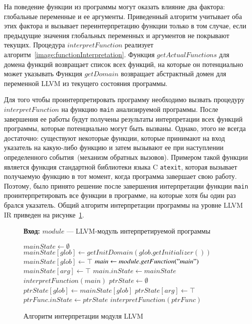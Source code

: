 На поведение функции из программы могут оказать влияние два фактора: 
глобальные переменные и ее аргументы. Приведенный алгоритм учитывает оба этих 
фактора и вызывает переинтерпретацию функции только в том случае, если 
предыдущие значения глобальных переменных и аргументов не покрывают текущих. 
Процедура $interpretFunction$ реализует 
алгоритм~\ref{image:functionInterpretation}. Функция $getActualFunctions$ для 
домена функций возвращает список всех функций, на которые он потенциально 
может указывать Функция $getDomain$ возвращает абстрактный домен для 
переменной LLVM из текущего состояния программы.

Для того чтобы проинтерпретировать программу необходимо вызвать процедуру 
$interpretFunction$ на функцию \texttt{main} анализируемой программы. После 
завершения ее работы будут получены результаты интерпретации всех функций
программы, которые потенциально могут быть вызваны. Однако, этого не всегда
достаточно: существуют некоторые функции, которые принимают на вход указатель
на какую-либо функцию и затем вызывают ее при наступлении определенного 
события~(механизм обратных вызовов). Примером такой функции является функция
стандартной библиотеки языка C \texttt{atexit}, которая вызывает получаемую 
функцию в тот момент, когда программа завершает свою работу. Поэтому, было
принято решение после завершения интерпретации функции \texttt{main}
проинтерпретировать все функции в программе, на которые хотя бы один раз
брался указатель. Общий алгоритм интерпретации программы на уровне LLVM IR 
приведен на рисунке~\ref{image:irInterpretation}.
\begin{figure}[h!]
\textbf{Вход:} $module$ --- LLVM-модуль интерпретируемой программы

\begin{algorithmic}[1]
\State $mainState \gets \emptyset$
        \State $mainState[glob] \gets getInitDomain(glob.getInitializer())$
    \Else
        \State $mainState[glob] \gets \top$
    \EndIf
\EndFor
\State $main \gets module.getFunction("main")$
    \State $mainState[arg] \gets \top$
\EndFor
\State $main.inState \gets mainState$
\State $interpretFunction(main)$
    \State $ptrState \gets \emptyset$
        \State $ptrState[glob] \gets mainState[glob]$
    \EndFor
        \State $ptrState[arg] \gets \top$
    \EndFor
    \State $ptrFunc.inState \gets ptrState$
    \State $interpretFunction(ptrFunc)$
\EndFor
\end{algorithmic}
\caption{Алгоритм интерпретации модуля LLVM}
\label{image:irInterpretation}
\end{figure}

